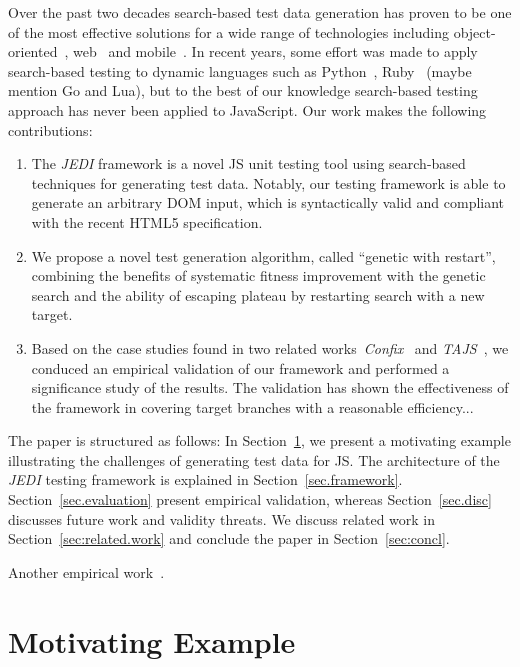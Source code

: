 \documentclass[sigconf,review,anonymous]{acmart}
\begin{document}
Over the past two decades search-based test data generation has proven to be one of the most effective solutions for a wide range of technologies including object-oriented~\cite{paper}, web~\cite{paper} and mobile~\cite{mao2016sapienz}. In recent years, some effort was made to apply search-based testing to dynamic languages such as Python~\cite{paper}, Ruby~\cite{paper} (maybe mention Go and Lua), but to the best of our knowledge search-based testing approach has never been applied to JavaScript. Our work makes the following contributions:
\begin{enumerate}[leftmargin=5mm]
\item The \emph{JEDI} framework is a novel JS unit testing tool using search-based techniques for generating test data. Notably, our testing framework is able to generate an arbitrary DOM input, which is syntactically valid and compliant with the recent HTML5 specification.   
\item We propose a novel test generation algorithm, called ``genetic with restart'', combining the benefits of systematic fitness improvement with the genetic search and the ability of escaping plateau by restarting search with a new target.
\item Based on the case studies found in two related works~\emph{Confix}~\cite{amin:ase15} and \emph{TAJS}~\cite{dom2011}, we conduced an empirical validation of our framework and performed a significance study of the results. The validation has shown the effectiveness of the framework in covering target branches with a reasonable efficiency...  
\end{enumerate} 

The paper is structured as follows: In Section~\ref{sec.example}, we present a motivating example illustrating the challenges of generating test data for JS. The architecture of the \emph{JEDI} testing framework is explained in Section~\ref{sec.framework}. Section~\ref{sec.evaluation} present empirical validation, whereas Section~\ref{sec.disc} discusses future work and validity threats. We discuss related work in Section~\ref{sec:related.work} and conclude the paper in Section~\ref{sec:concl}.  

Another empirical work~\cite{richards2010analysis}.

\section{Motivating Example}
\label{sec.example}
\end{document}
